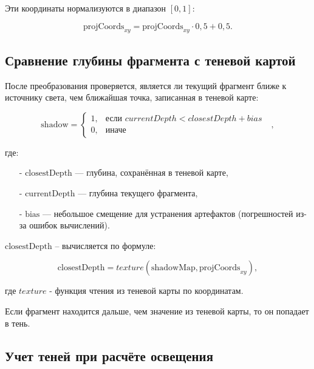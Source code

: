 Эти координаты нормализуются в диапазон \([0, 1]\):

\begin{equation}
    \label{equ:normilized_coords}
    \text{projCoords}_{xy} = \text{projCoords}_{xy} \cdot 0,5 + 0,5.
\end{equation}

\subsection*{Сравнение глубины фрагмента с теневой картой}

После преобразования проверяется,
является ли текущий фрагмент ближе к источнику света,
чем ближайшая точка, записанная в теневой карте:

\begin{equation}
    \label{equ:depth_check}
    \text{shadow} = 
    \begin{cases}
        1, & \text{если $currentDepth < closestDepth + bias$ }\\
        0, & \text{иначе}
    \end{cases},
\end{equation}

\noindent где:

\begin{itemize}
    \item[-] \(\text{closestDepth}\) — глубина, сохранённая в теневой карте,
    \item[-] \(\text{currentDepth}\) — глубина текущего фрагмента,
    \item[-] \(\text{bias}\) — небольшое смещение для устранения артефактов (погрешностей из-за ошибок вычислений).
\end{itemize}

\(\text{closestDepth}\) -- вычисляется по формуле:

\begin{equation}
    \label{equ:texture_std}
    \text{closestDepth} = texture(\text{shadowMap}, \text{projCoords}_{xy}),
\end{equation}

\noindent где $texture$ - функция чтения из теневой карты по координатам.

Если фрагмент находится дальше, чем значение из теневой карты,
то он попадает в тень.

\subsection*{Учет теней при расчёте освещения}

